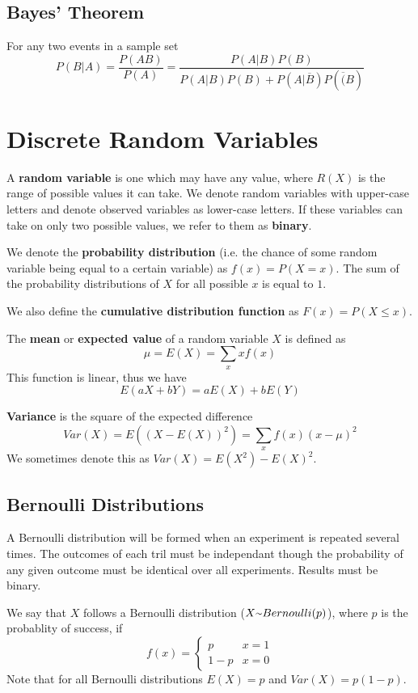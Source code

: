 \documentclass[12pt]{article}
\begin{document}
\subsection*{Bayes' Theorem}
For any two events in a sample set \[ P(B|A) = \frac{P(AB)}{P(A)} = \frac{P(A|B)P(B)}{P(A|B)P(B) + P(A|\overline{B})P(\overline(B)} \]

\section*{Discrete Random Variables}
A {\bf random variable} is one which may have any value, where $R(X)$ is the range of possible values it can take. We denote random variables with upper-case letters and denote observed variables as lower-case letters. If these variables can take on only two possible values, we refer to them as {\bf binary}.

We denote the {\bf probability distribution} (i.e. the chance of some random variable being equal to a certain variable) as $f(x) = P(X = x)$. The sum of the probability distributions of $X$ for all possible $x$ is equal to $1$.

We also define the {\bf cumulative distribution function} as $F(x) = P(X \leq x)$.

The {\bf mean} or {\bf expected value} of a random variable $X$ is defined as \[ \mu = E(X) = \sum_x xf(x) \] This function is linear, thus we have \[ E(aX + bY) = aE(X) + bE(Y) \]

{\bf Variance} is the square of the expected difference \[ Var(X) = E((X - E(X))^2) = \sum_x f(x)(x - \mu)^2 \] We sometimes denote this as $Var(X) = E(X^2) - E(X)^2$.

\subsection*{Bernoulli Distributions}
A Bernoulli distribution will be formed when an experiment is repeated several times. The outcomes of each tril must be independant though the probability of any given outcome must be identical over all experiments. Results must be binary.

We say that $X$ follows a Bernoulli distribution ($X \ttilde Bernoulli(p)$), where $p$ is the probablity of success, if
\[ f(x) =
    \begin{cases}
    p & x = 1\\
    1-p & x = 0
    \end{cases}
\] Note that for all Bernoulli distributions $E(X) = p$ and $Var(X) = p(1-p)$.
\end{document}
